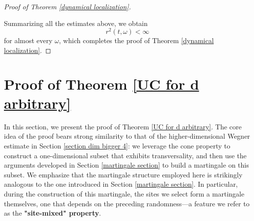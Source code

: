 \documentclass[11pt,reqno,UTF8,twoside]{amsart}
\theoremstyle{definition}
\numberwithin{equation}{section}
\begin{document}
\begin{proof}[Proof of Theorem \ref{dynamical localization}]
\begin{itemize}
    
\end{itemize}
Summarizing all the estimates above, we obtain
\[r^2(t,\omega)<\infty\]
for almost every $\omega$, which completes the proof of Theorem \ref{dynamical localization}.







  
\end{proof}










\appendix
\section{Proof of Theorem \ref{UC for d arbitrary}}\label{Appendix UC}
In this section, we present the proof of Theorem \ref{UC for d arbitrary}. The core idea of the proof bears strong similarity to that of the higher-dimensional Wegner estimate in Section \ref{section dim bigger 4}: we leverage the cone property to construct a one-dimensional subset that exhibits transversality, and then use the arguments developed in Section \ref{martingale section} to build a martingale on this subset. We emphasize that the martingale structure employed here is strikingly analogous to the one introduced in Section \ref{martingale section}. In particular, during the construction of this martingale, the sites we select form a martingale themselves, one that depends on the preceding randomness—a feature we refer to as the {\bf "site-mixed" property}.
\end{document}
